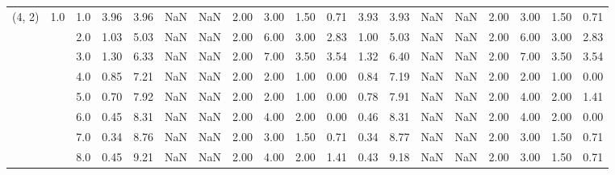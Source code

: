 \begin{tabular}{lllrrrrrrrrrrrrrrrr}
(4, 2) & 1.0 & 1.0  &      3.96 &       3.96 &               NaN &                NaN & 2.00 &   3.00 &             1.50 &                         0.71 &      3.93 &       3.93 &               NaN &                NaN & 2.00 &   3.00 &             1.50 &                         0.71 \\
       &     & 2.0  &      1.03 &       5.03 &               NaN &                NaN & 2.00 &   6.00 &             3.00 &                         2.83 &      1.00 &       5.03 &               NaN &                NaN & 2.00 &   6.00 &             3.00 &                         2.83 \\
       &     & 3.0  &      1.30 &       6.33 &               NaN &                NaN & 2.00 &   7.00 &             3.50 &                         3.54 &      1.32 &       6.40 &               NaN &                NaN & 2.00 &   7.00 &             3.50 &                         3.54 \\
       &     & 4.0  &      0.85 &       7.21 &               NaN &                NaN & 2.00 &   2.00 &             1.00 &                         0.00 &      0.84 &       7.19 &               NaN &                NaN & 2.00 &   2.00 &             1.00 &                         0.00 \\
       &     & 5.0  &      0.70 &       7.92 &               NaN &                NaN & 2.00 &   2.00 &             1.00 &                         0.00 &      0.78 &       7.91 &               NaN &                NaN & 2.00 &   4.00 &             2.00 &                         1.41 \\
       &     & 6.0  &      0.45 &       8.31 &               NaN &                NaN & 2.00 &   4.00 &             2.00 &                         0.00 &      0.46 &       8.31 &               NaN &                NaN & 2.00 &   4.00 &             2.00 &                         0.00 \\
       &     & 7.0  &      0.34 &       8.76 &               NaN &                NaN & 2.00 &   3.00 &             1.50 &                         0.71 &      0.34 &       8.77 &               NaN &                NaN & 2.00 &   3.00 &             1.50 &                         0.71 \\
       &     & 8.0  &      0.45 &       9.21 &               NaN &                NaN & 2.00 &   4.00 &             2.00 &                         1.41 &      0.43 &       9.18 &               NaN &                NaN & 2.00 &   3.00 &             1.50 &                         0.71 \\

\end{tabular}
